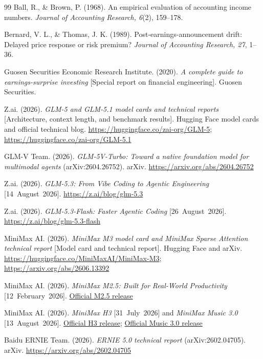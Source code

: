 \documentclass[11pt]{article}
\begin{document}
\begin{thebibliography}{99}
Ball, R., \& Brown, P. (1968). An empirical evaluation of accounting income numbers. \emph{Journal of
Accounting Research, 6}(2), 159--178.

Bernard, V. L., \& Thomas, J. K. (1989). Post-earnings-announcement drift: Delayed price response or risk
premium? \emph{Journal of Accounting Research, 27}, 1--36.

Guosen Securities Economic Research Institute. (2020). \emph{A complete guide to earnings-surprise investing}
[Special report on financial engineering]. Guosen Securities.

Z.ai. (2026). \emph{GLM-5 and GLM-5.1 model cards and technical reports} [Architecture, context length,
and benchmark results]. Hugging Face model cards and official technical blog.
\url{https://huggingface.co/zai-org/GLM-5}; \url{https://huggingface.co/zai-org/GLM-5.1}

GLM-V Team. (2026). \emph{GLM-5V-Turbo: Toward a native foundation model for multimodal agents}
(arXiv:2604.26752). arXiv. \url{https://arxiv.org/abs/2604.26752}

Z.ai. (2026). \emph{GLM-5.3: From Vibe Coding to Agentic Engineering} [14~August~2026].
\url{https://z.ai/blog/glm-5.3}

Z.ai. (2026). \emph{GLM-5.3-Flash: Faster Agentic Coding} [26~August~2026].
\url{https://z.ai/blog/glm-5.3-flash}

MiniMax AI. (2026). \emph{MiniMax M3 model card and MiniMax Sparse Attention technical report}
[Model card and technical report]. Hugging Face and arXiv.
\url{https://huggingface.co/MiniMaxAI/MiniMax-M3}; \url{https://arxiv.org/abs/2606.13392}

MiniMax AI. (2026). \emph{MiniMax M2.5: Built for Real-World Productivity} [12~February~2026].
\href{https://www.minimax.io/news/minimax-m25}{Official M2.5 release}

MiniMax AI. (2026). \emph{MiniMax H3} [31~July~2026] and \emph{MiniMax Music 3.0}
[13~August~2026]. \href{https://www.minimax.io/blog/minimax-h3}{Official H3 release};
\href{https://www.minimax.io/blog/minimax-music-3-0-next-generation-open-weights-production-ready-versatile-music-model}{Official Music 3.0 release}

Baidu ERNIE Team. (2026). \emph{ERNIE 5.0 technical report} (arXiv:2602.04705). arXiv.
\url{https://arxiv.org/abs/2602.04705}


\end{thebibliography}
\end{document}
